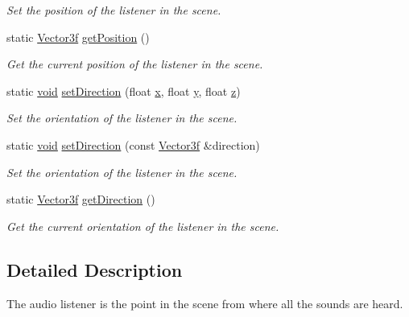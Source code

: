 \begin{DoxyCompactItemize}
\begin{DoxyCompactList}\small\item\em Set the position of the listener in the scene. \end{DoxyCompactList}\item 
static \hyperlink{namespacesf_af97357d7d32e7d6a700d03be2f3b4811}{Vector3f} \hyperlink{classsf_1_1_listener_acd7ee65bc948ca38e1c669aa12340c54}{get\-Position} ()
\begin{DoxyCompactList}\small\item\em Get the current position of the listener in the scene. \end{DoxyCompactList}\item 
static \hyperlink{glutf90_8h_ac778d6f63f1aaf8ebda0ce6ac821b56e}{void} \hyperlink{classsf_1_1_listener_ae479dc15513c6557984d26e32d06d06e}{set\-Direction} (float \hyperlink{gl3_8h_a92d0386e5c19fb81ea88c9f99644ab1d}{x}, float \hyperlink{gl3_8h_a66ddd433d2cacfe27f5906b7e86faeed}{y}, float \hyperlink{gl3_8h_acb78bf1972d3eaf07da34ff2e0a2f133}{z})
\begin{DoxyCompactList}\small\item\em Set the orientation of the listener in the scene. \end{DoxyCompactList}\item 
static \hyperlink{glutf90_8h_ac778d6f63f1aaf8ebda0ce6ac821b56e}{void} \hyperlink{classsf_1_1_listener_a1d99d9457c6ddad93449ecb4f504c2bf}{set\-Direction} (const \hyperlink{namespacesf_af97357d7d32e7d6a700d03be2f3b4811}{Vector3f} \&direction)
\begin{DoxyCompactList}\small\item\em Set the orientation of the listener in the scene. \end{DoxyCompactList}\item 
static \hyperlink{namespacesf_af97357d7d32e7d6a700d03be2f3b4811}{Vector3f} \hyperlink{classsf_1_1_listener_a54e91baba51d4431474f53ff7f9309f9}{get\-Direction} ()
\begin{DoxyCompactList}\small\item\em Get the current orientation of the listener in the scene. \end{DoxyCompactList}\end{DoxyCompactItemize}


\subsection{Detailed Description}
The audio listener is the point in the scene from where all the sounds are heard. 

